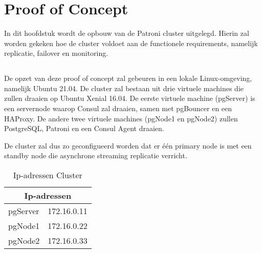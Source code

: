 
\chapter{Proof of Concept}
\label{ch:Proof of Concept}

In dit hoofdstuk wordt de opbouw van de Patroni cluster uitgelegd. Hierin zal worden gekeken hoe de cluster voldoet aan de functionele requirements, namelijk replicatie, failover en monitoring.

\section{}
\label{sec:Omgeving}
De opzet van deze proof of concept zal gebeuren in een lokale Linux-omgeving, namelijk Ubuntu 21.04.
De cluster zal bestaan uit drie virtuele machines die zullen draaien op Ubuntu Xenial 16.04. De eerste virtuele machine (pgServer) is een servernode waarop Consul zal draaien, samen met pgBouncer en een HAProxy. De andere twee virtuele machines (pgNode1 en pgNode2) zullen PostgreSQL, Patroni en een Consul Agent draaien.

De cluster zal dus zo geconfigueerd worden dat er één primary node is met een standby node die asynchrone streaming replicatie verricht.

\begin{table}
    \centering
    \begin{tabular}{ |p{6cm}||p{6cm}|  }
        \hline
        \multicolumn{2}{|c|}{Ip-adressen} \\
        \hline
        pgServer & 172.16.0.11 \\
        \hline
        pgNode1 & 172.16.0.22 \\
        \hline
        pgNode2 & 172.16.0.33 \\
        \hline
    \end{tabular}
    \caption{Ip-adressen Cluster}
    \label{table:Ip-adressen Cluster}
\end{table}

\section{}
\label{sec:Prerequisites}

